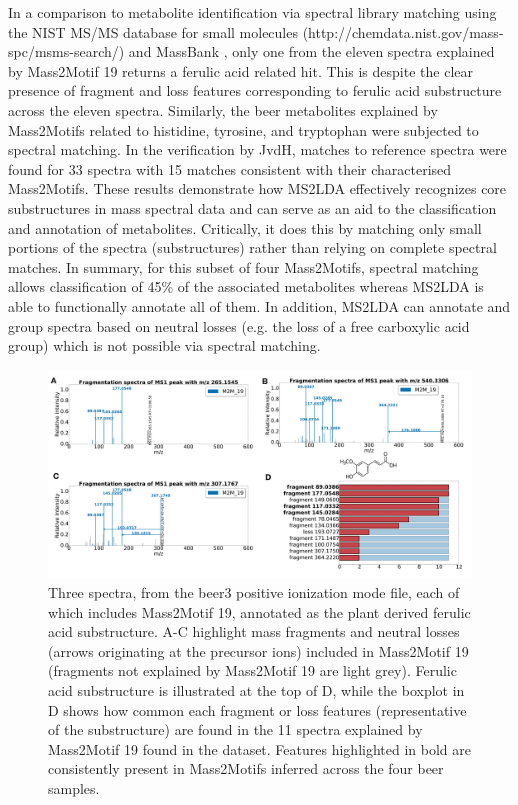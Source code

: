 In a comparison to metabolite identification via spectral library matching using the NIST MS/MS database for small molecules (http://chemdata.nist.gov/mass-spc/msms-search/) and MassBank \cite{horai2010massbank}, only one from the eleven spectra explained by Mass2Motif 19 returns a ferulic acid related hit. This is despite the clear presence of fragment and loss features corresponding to ferulic acid substructure across the eleven spectra. Similarly, the beer metabolites explained by Mass2Motifs related to histidine, tyrosine, and tryptophan were subjected to spectral matching. In the verification by JvdH, matches to reference spectra were found for 33 spectra with 15 matches consistent with their characterised Mass2Motifs. These results demonstrate how MS2LDA effectively recognizes core substructures in mass spectral data and can serve as an aid to the classification and annotation of metabolites. Critically, it does this by matching only small portions of the spectra (substructures) rather than relying on complete spectral matches. In summary, for this subset of four Mass2Motifs, spectral matching allows classification of 45\% of the associated metabolites whereas MS2LDA is able to functionally annotate all of them. In addition, MS2LDA can annotate and group spectra based on neutral losses (e.g. the loss of a free carboxylic acid group) which is not possible via spectral matching.

\begin{figure}[!htbp]
\centering\includegraphics[width=0.8\linewidth]{07-lda/figures/figure3.pdf}
\centering\caption{Three spectra, from the beer3 positive ionization mode file, each of which includes Mass2Motif 19, annotated as the plant derived ferulic acid substructure. A-C highlight mass fragments and neutral losses (arrows originating at the precursor ions) included in Mass2Motif 19 (fragments not explained by Mass2Motif 19 are light grey). Ferulic acid substructure is illustrated at the top of D, while the boxplot in D shows how common each fragment or loss features (representative of the substructure) are found in the 11 spectra explained by Mass2Motif 19 found in the dataset. Features highlighted in bold are consistently present in Mass2Motifs inferred across the four beer samples.\label{fig:m2lda-ferulic-acid}}
\end{figure}

